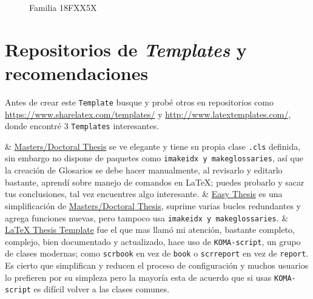 \begin{figure}[H]
	\centering
	\caption{Familia 18FXX5X}
	\label{fig:18FXX5X}
\end{figure}

\section{Repositorios de \textit{Templates} y recomendaciones}
Antes de crear este \verb|Template| busque y probé otros en repositorios como \url{https://www.sharelatex.com/templates/} y \url{http://www.latextemplates.com/}, donde encontré 3 \verb|Templates| interesantes.
\Activate
\begin{easylist}[itemize]	
	& \href{http://www.latextemplates.com/template/masters-doctoral-thesis}{Masters/Doctoral Thesis} se ve elegante y tiene su propia clase \verb|.cls| definida, sin embargo no dispone de paquetes como \verb|imakeidx y makeglossaries|, así que la creación de Glosarios se debe hacer manualmente, al revisarlo y editarlo bastante, aprendí sobre manejo de comandos en {\LaTeX}; puedes probarlo y sacar tus conclusiones, tal vez encuentres algo interesante.
	& \href{https://www.sharelatex.com/templates/thesis/easy-thesis}{Easy Thesis} es una simplificación de \href{http://www.latextemplates.com/template/masters-doctoral-thesis}{Masters/Doctoral Thesis}, suprime varias bucles redundantes y agrega funciones nuevas, pero tampoco usa \verb|imakeidx y makeglossaries|.
	& \href{http://www.matthiaspospiech.de/downloads/}{LaTeX Thesis Template} fue el que mas llamó mi atención, bastante completo, complejo, bien documentado y actualizado, hace uso de \verb|KOMA-script|, un grupo de clases modernas; como \verb|scrbook| en vez de \verb|book| o \verb|scrreport| en vez de \verb|report|. Es cierto que simplifican y reducen el proceso de configuración y muchos usuarios lo prefieren por su simpleza pero la mayoría esta de acuerdo que si usas \verb|KOMA-script| es difícil volver a las clases comunes.
\end{easylist}
\Deactivate

